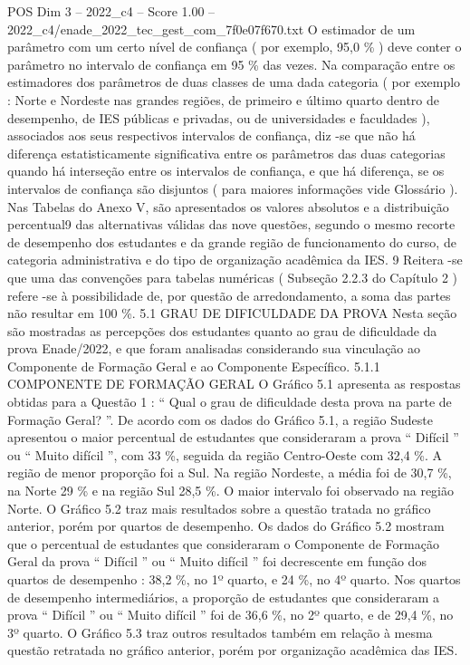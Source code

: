 \begin{textsample}{POS Dim 3 – 2022\_c4 – Score 1.00 – 2022\_c4/enade\_2022\_tec\_gest\_com\_7f0e07f670.txt}
O estimador de um parâmetro com um certo nível de confiança ( por exemplo, 95,0 \% ) deve conter o parâmetro no intervalo de confiança em 95 \% das vezes.
Na comparação entre os estimadores dos parâmetros de duas classes de uma dada categoria ( por exemplo : Norte e Nordeste nas grandes regiões, de primeiro e último quarto dentro de desempenho, de IES públicas e privadas, ou de universidades e faculdades ), associados aos seus respectivos intervalos de confiança, diz -se que não há diferença estatisticamente significativa entre os parâmetros das duas categorias quando há interseção entre os intervalos de confiança, e que há diferença, se os intervalos de confiança são disjuntos ( para maiores informações vide Glossário ).
Nas Tabelas do Anexo V, são apresentados os valores absolutos e a distribuição percentual9 das alternativas válidas das nove questões, segundo o mesmo recorte de desempenho dos estudantes e da grande região de funcionamento do curso, de categoria administrativa e do tipo de organização acadêmica da IES. 9 Reitera -se que uma das convenções para tabelas numéricas ( Subseção 2.2.3 do Capítulo 2 ) refere -se à possibilidade de, por questão de arredondamento, a soma das partes não resultar em 100 \%. 5.1 GRAU DE DIFICULDADE DA PROVA Nesta seção são mostradas as percepções dos estudantes quanto ao grau de dificuldade da prova Enade/2022, e que foram analisadas considerando sua vinculação ao Componente de Formação Geral e ao Componente Específico. 5.1.1 COMPONENTE DE FORMAÇÃO GERAL O Gráfico 5.1 apresenta as respostas obtidas para a Questão 1 : “ Qual o grau de dificuldade desta prova na parte de Formação Geral? ”.
De acordo com os dados do Gráfico 5.1, a região Sudeste apresentou o maior percentual de estudantes que consideraram a prova “ Difícil ” ou “ Muito difícil ”, com 33 \%, seguida da região Centro-Oeste com 32,4 \%.
A região de menor proporção foi a Sul.
Na região Nordeste, a média foi de 30,7 \%, na Norte 29 \% e na região Sul 28,5 \%.
O maior intervalo foi observado na região Norte.
O Gráfico 5.2 traz mais resultados sobre a questão tratada no gráfico anterior, porém por quartos de desempenho.
Os dados do Gráfico 5.2 mostram que o percentual de estudantes que consideraram o Componente de Formação Geral da prova “ Difícil ” ou “ Muito difícil ” foi decrescente em função dos quartos de desempenho : 38,2 \%, no 1º quarto, e 24 \%, no 4º quarto.
Nos quartos de desempenho intermediários, a proporção de estudantes que consideraram a prova “ Difícil ” ou “ Muito difícil ” foi de 36,6 \%, no 2º quarto, e de 29,4 \%, no 3º quarto.
O Gráfico 5.3 traz outros resultados também em relação à mesma questão retratada no gráfico anterior, porém por organização acadêmica das IES.

\end{textsample}
